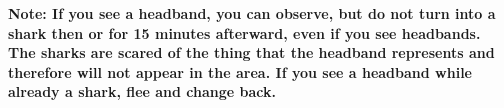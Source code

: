 \documentclass[green]{NeptuneBall}
\begin{document}
{\bf Note: If you see a  headband, you can observe, but do not turn into a shark then or for 15 minutes afterward, even if you see  headbands. The sharks are scared of the thing that the  headband represents and therefore will not appear in the area. If you see a  headband while already a shark, flee and change back.}
\end{document}
